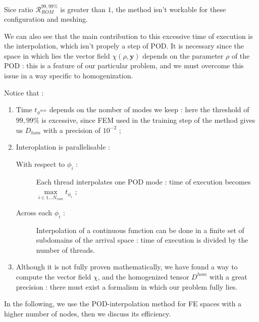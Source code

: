 {\etoile
\newlength{\currentparskip}
\setlength{\currentparskip}{\parskip}
\begin{minipage}{\linewidth}
\setlength{\parskip}{\currentparskip}
Sice ratio $\mathcal{R}_{ROM}^{99,99\%}$ is greater than $1$, the method isn't workable for these configuration and meshing.

\par
We can also see that the main contribution to this excessive time of execution is the interpolation, which isn't propely a step of POD. %
It is necessary since the space in which lies the vector field $\chi(\rho,\mathbf{y})$ depends on the parameter $\rho$ of the POD : %
this is a feature of our particular problem, and we must overcome this issue in a way specific to homogenization.

\par
Notice that :

\begin{enumerate}[label=(interp \roman*)]
\item Time $t_{\phi^{new}}$ depends on the nomber of modes we keep : here the threshold of $99,99\%$ is excessive, since FEM used in the training step of the method gives us $D_{hom}$ with a precision of $10^{-2}$ ;
\item Interoplation is parallelisable :
\begin{description}
\item [With respect to $\phi_i$ :] Each thread interpolates one POD mode : time of execution becomes $\max\limits_{i\in 1\dots N_{rom}}t_{\phi_i}$ ;
\item [Across each $\phi_i$ :] Interpolation of a continuous function can be done in a finite set of subdomains of the arrival space : %
time of execution is divided by the number of threads.
\end{description}
\item Although it is not fully proven mathematically, we have found a way to compute the vector field $\chi$, and the homogenized tensor $D^{hom}$ with a great precision : %
there must exist a formalism in which our problem fully lies.
\end{enumerate}
\end{minipage}

\ligneinter
In the following, we use the POD-interpolation method for FE spaces with a higher number of nodes, %
then we discuss its efficiency.

}
